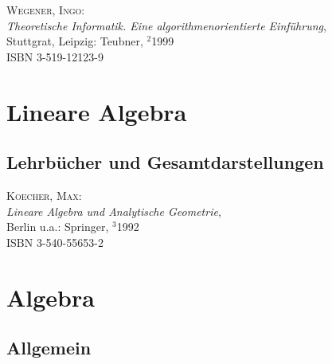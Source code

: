 \begin{description}

\item \textsc{Wegener, Ingo}: \\
\textit{Theoretische Informatik. Eine algorithmenorientierte 
Einf\"uhrung}, \\
Stuttgrat, Leipzig: Teubner, $^2$1999 \\
ISBN 3-519-12123-9

\end{description}



\section{Lineare Algebra}

\subsection{Lehrb\"ucher und Gesamtdarstellungen}

\begin{description}

\item \textsc{Koecher, Max}: \\
\textit{Lineare Algebra und Analytische Geometrie}, \\
Berlin u.a.: Springer, $^3$1992 \\
ISBN 3-540-55653-2

\end{description}

\section{Algebra} 

\subsection{Allgemein}

